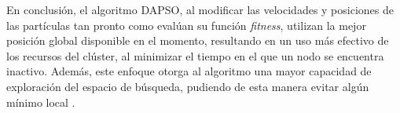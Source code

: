 \vspace{10pt}
En conclusión, el algoritmo DAPSO, al modificar las velocidades y posiciones de las partículas tan pronto como 
evalúan su función \textit{fitness}, utilizan la mejor posición global disponible en el momento, resultando en un 
uso más efectivo de los recursos del clúster, al minimizar el tiempo en el que un nodo se encuentra inactivo. 
Además, este enfoque otorga al algoritmo una mayor capacidad de exploración del espacio de búsqueda, pudiendo de 
esta manera evitar algún mínimo local \cite{dapso}.

\endinput
